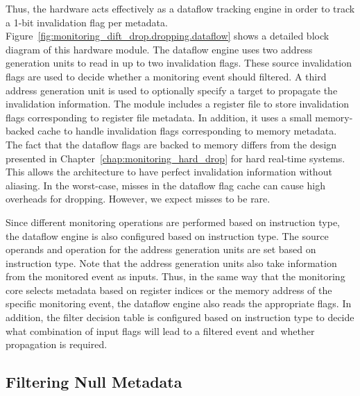 Thus, the hardware acts effectively as a dataflow tracking engine in order to
track a 1-bit invalidation flag per metadata.
Figure~\ref{fig:monitoring_dift_drop.dropping.dataflow} shows a detailed block
diagram of this hardware module. The dataflow engine uses two address
generation units to read in up to two invalidation flags. These source
invalidation flags are used to decide whether a monitoring event should
filtered. A third address generation unit is used to optionally specify a
target to propagate the invalidation information. The module includes a
register file to store invalidation flags corresponding to register file
metadata. In addition, it uses a small memory-backed cache to handle
invalidation flags corresponding to memory metadata. The fact that the dataflow
flags are backed to memory differs from the design presented in
Chapter~\ref{chap:monitoring_hard_drop} for hard real-time systems. This allows
the architecture to have perfect invalidation information without aliasing. In
the worst-case, misses in the dataflow flag cache can cause high overheads for
dropping. However, we expect misses to be rare.

Since different monitoring operations are performed based on instruction type,
the dataflow engine is also configured based on instruction type. The source operands
and operation for the address generation units are set based on instruction
type. Note that the address generation units also take information from the
monitored event as inputs. Thus, in the same way that the monitoring core selects
metadata based on register indices or the memory address of the specific monitoring
event, the dataflow engine also reads the appropriate flags. In addition, the
filter decision table is configured based on instruction type to decide what
combination of input flags will lead to a filtered event and whether
propagation is required.

\subsection{Filtering Null Metadata}
\label{sec:monitoring_dift_drop.dropping.null_filtering}

